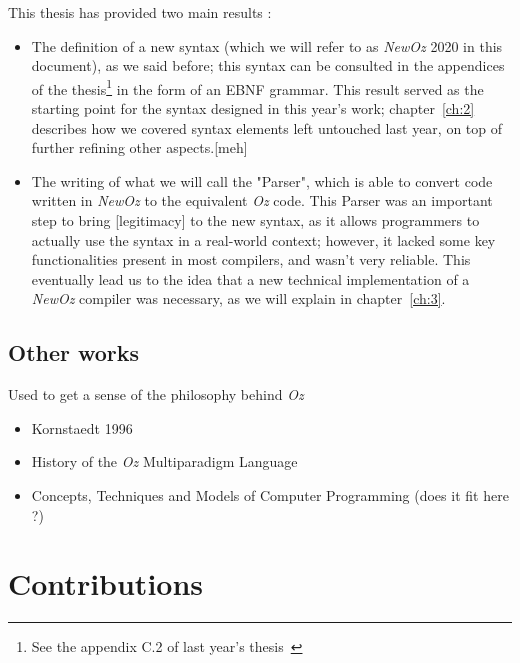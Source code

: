 This thesis has provided two main results :
\begin{itemize}
    \item The definition of a new syntax (which we will refer to as \textit{NewOz} 2020 in this document), as we said before;
    this syntax can be consulted in the appendices of the thesis\footnote{See the appendix C.2 of last year's thesis~\cite{jpthesis}} in the form of an EBNF grammar.
    This result served as the starting point for the syntax designed in this year's work;
    chapter~\ref{ch:2} describes how we covered syntax elements left untouched last year, on top of further refining other aspects.[meh]
    \item The writing of what we will call the "Parser", which is able to convert code written in \textit{NewOz} to the equivalent \textit{Oz} code.
    This Parser was an important step to bring [legitimacy] to the new syntax, as it allows programmers to actually use the syntax in a real-world context;
    however, it lacked some key functionalities present in most compilers, and wasn't very reliable.
    This eventually lead us to the idea that a new technical implementation of a \textit{NewOz} compiler was necessary, as we will explain in chapter~\ref{ch:3}.
\end{itemize}

\subsection{Other works}\label{subsec:ch1-others}
Used to get a sense of the philosophy behind \textit{Oz}
\begin{itemize}
    \item Kornstaedt 1996
    \item History of the \textit{Oz} Multiparadigm Language
    \item Concepts, Techniques and Models of Computer Programming (does it fit here ?)
\end{itemize}

\section{Contributions}\label{sec:ch1-3}

